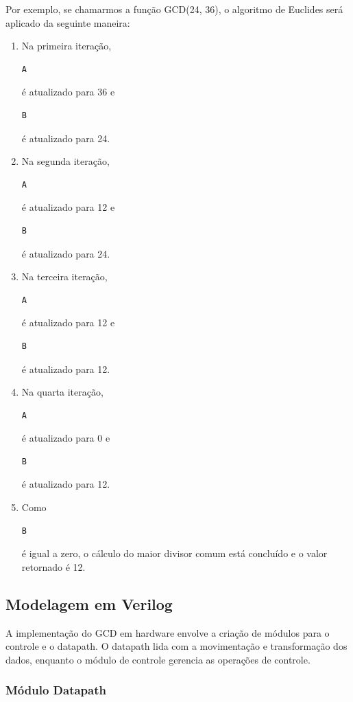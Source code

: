 \documentclass[a4paper,11pt]{article} %
\begin{document}
Por exemplo, se chamarmos a função GCD(24, 36), o algoritmo de Euclides será aplicado da seguinte maneira:

\begin{enumerate}
    \item Na primeira iteração, \begin{verbatim}A\end{verbatim} é atualizado para 36 e \begin{verbatim}B\end{verbatim} é atualizado para 24.
    \item Na segunda iteração, \begin{verbatim}A\end{verbatim} é atualizado para 12 e \begin{verbatim}B\end{verbatim} é atualizado para 24.
    \item Na terceira iteração, \begin{verbatim}A\end{verbatim} é atualizado para 12 e \begin{verbatim}B\end{verbatim} é atualizado para 12.
    \item Na quarta iteração, \begin{verbatim}A\end{verbatim} é atualizado para 0 e \begin{verbatim}B\end{verbatim} é atualizado para 12.
    \item Como \begin{verbatim}B\end{verbatim} é igual a zero, o cálculo do maior divisor comum está concluído e o valor retornado é 12.
\end{enumerate}


\subsection{Modelagem em Verilog}

A implementação do GCD em hardware envolve a 
criação de módulos para o controle e o datapath. 
O datapath lida com a movimentação e transformação dos dados, 
enquanto o módulo de controle gerencia as operações de controle.

\subsubsection{Módulo Datapath}
\end{document}
